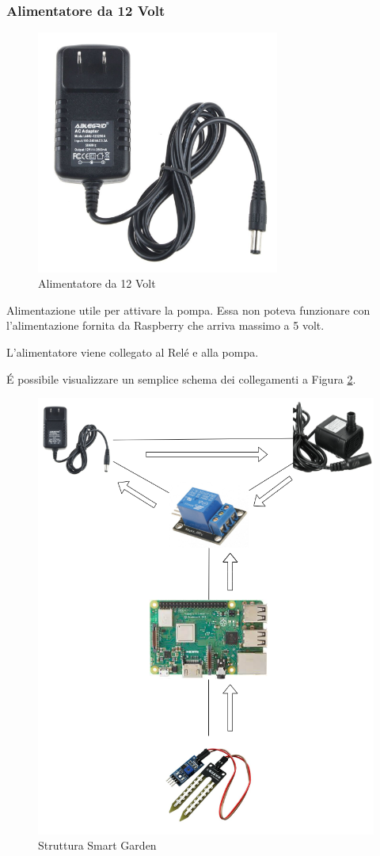 \subsubsection{Alimentatore da 12 Volt}
\begin{figure}
    \centering
    \includegraphics[width=8cm]{Immagini/12v_power_supply}
    \caption{Alimentatore da 12 Volt}
    \label{fig:12v_power_supply}
\end{figure}
Alimentazione utile per attivare la pompa. Essa non poteva funzionare con l'alimentazione fornita da Raspberry che arriva massimo a 5 volt. 

L'alimentatore viene collegato al Rel\'e e alla pompa.

\'E possibile visualizzare un semplice schema dei collegamenti a Figura \ref{fig:smart_garden_structure}.

\begin{figure}
    \centering
    \includegraphics[width=12cm]{Immagini/smart_garden_structure}
    \caption{Struttura Smart Garden}
    \label{fig:smart_garden_structure}
\end{figure}

